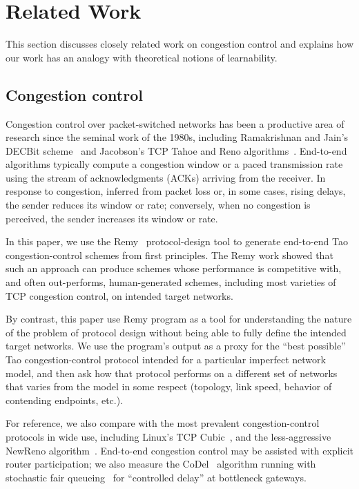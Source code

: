 \section{Related Work}
\label{s: learnability}

This section discusses closely related work on congestion control and
explains how our work has an analogy with theoretical notions of
learnability.

\subsection{Congestion control}

Congestion control over packet-switched networks has been a productive
area of research since the seminal work of the 1980s, including
Ramakrishnan and Jain's DECBit scheme~\cite{decbit} and Jacobson's TCP
Tahoe and Reno algorithms~\cite{Jacobson88}. End-to-end algorithms
typically compute a congestion window or a paced transmission rate
using the stream of acknowledgments (ACKs) arriving from the
receiver. In response to congestion, inferred from packet loss or, in
some cases, rising delays, the sender reduces its window or rate;
conversely, when no congestion is perceived, the sender increases its
window or rate.

In this paper, we use the Remy~\cite{remy} protocol-design tool to
generate end-to-end Tao congestion-control schemes from first
principles. The Remy work showed that such an approach can produce
schemes whose performance is competitive with, and often out-performs,
human-generated schemes, including most varieties of TCP congestion
control, on intended target networks.

By contrast, this paper use Remy program as a tool for understanding
the nature of the problem of protocol design without being able to
fully define the intended target networks. We use the program's output
as a proxy for the ``best possible'' Tao congestion-control protocol
intended for a particular imperfect network model, and then ask how
that protocol performs on a different set of networks that varies from
the model in some respect (topology, link speed, behavior of
contending endpoints, etc.).

For reference, we also compare with the most prevalent
congestion-control protocols in wide use, including Linux's TCP
Cubic~\cite{cubic}, and the less-aggressive NewReno
algorithm~\cite{newreno}. End-to-end congestion control may be
assisted with explicit router participation; we also measure the
CoDel~\cite{CoDel} algorithm running with stochastic fair
queueing~\cite{sfq} for ``controlled delay'' at bottleneck gateways.

